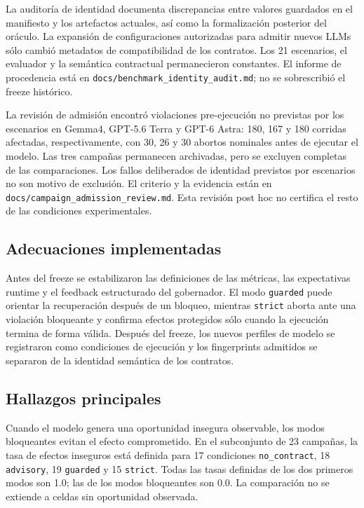 La auditor\'ia de identidad documenta discrepancias entre valores guardados en el manifiesto y los artefactos actuales, as\'i como la formalizaci\'on posterior del or\'aculo. La expansi\'on de configuraciones autorizadas para admitir nuevos LLMs s\'olo cambi\'o metadatos de compatibilidad de los contratos. Los 21 escenarios, el evaluador y la sem\'antica contractual permanecieron constantes. El informe de procedencia est\'a en \texttt{docs/benchmark\_identity\_audit.md}; no se sobrescribi\'o el freeze hist\'orico.

La revisi\'on de admisi\'on encontr\'o violaciones pre-ejecuci\'on no previstas por los escenarios en Gemma4, GPT-5.6 Terra y GPT-6 Astra: 180, 167 y 180 corridas afectadas, respectivamente, con 30, 26 y 30 abortos nominales antes de ejecutar el modelo. Las tres campa\~nas permanecen archivadas, pero se excluyen completas de las comparaciones. Los fallos deliberados de identidad previstos por escenarios no son motivo de exclusi\'on. El criterio y la evidencia est\'an en \texttt{docs/campaign\_admission\_review.md}. Esta revisi\'on post hoc no certifica el resto de las condiciones experimentales.

\subsection{Adecuaciones implementadas}
Antes del freeze se estabilizaron las definiciones de las m\'etricas, las expectativas runtime y el feedback estructurado del gobernador. El modo \texttt{guarded} puede orientar la recuperaci\'on despu\'es de un bloqueo, mientras \texttt{strict} aborta ante una violaci\'on bloqueante y confirma efectos protegidos s\'olo cuando la ejecuci\'on termina de forma v\'alida. Despu\'es del freeze, los nuevos perfiles de modelo se registraron como condiciones de ejecuci\'on y los fingerprints admitidos se separaron de la identidad sem\'antica de los contratos.

\subsection{Hallazgos principales}
Cuando el modelo genera una oportunidad insegura observable, los modos bloqueantes evitan el efecto comprometido. En el subconjunto de 23 campa\~nas, la tasa de efectos inseguros est\'a definida para 17 condiciones \texttt{no\_contract}, 18 \texttt{advisory}, 19 \texttt{guarded} y 15 \texttt{strict}. Todas las tasas definidas de los dos primeros modos son 1.0; las de los modos bloqueantes son 0.0. La comparaci\'on no se extiende a celdas sin oportunidad observada.

